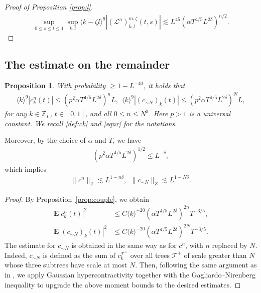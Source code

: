 \documentclass[UTF-8,reqno]{amsart}
\numberwithin{equation}{section}
\newtheorem{proposition}[theorem]{Proposition}
\theoremstyle{definition}
\def\geq{\geqslant}
\def\leq{\leqslant}
\def\geq{\geqslant}
\def\leq{\leqslant}
\begin{document}
\begin{proof}[Proof of Proposition \ref{prop:l}]
\begin{align*}
   \sup _{0 \leq s \leq t \leq 1}   \sup _{k, l}  \langle k-\zeta  l\rangle^{9}\left|\left(\mathscr{L}^{n}\right)_{k, l}^{m, \zeta}(t, s)\right|\lesssim L^{45} (\alpha  T^{4/5} L^{2\delta})^{n/2}.
\end{align*} 


\end{proof}
 

\subsection{The estimate on the remainder}

\begin{proposition}\label{prop:ckn}
      With probability $\geq 1-L^{-40}$, it holds that 
      \begin{align*}
        \langle k\rangle^{9}| c_k^{n}(t)|\leq  (p^2\alpha  T^{4/5}  L^{2\delta} )^{n}L,\ \ \langle k\rangle^{9}|(c_{\sim N})_k(t)|\leq (p^2\alpha  T^{4/5}  L^{2\delta} )^{N}L,
      \end{align*}
     for any $k \in\mathbb{Z}_L$, $t \in[0,1]$, and all $0 \leq  n \leq N^3$. Here $p>1$ is a universal constant. We recall \eqref{def:ck} and \eqref{eqnr} for the notations. 
  \end{proposition}
      
      Moreover, by the choice of $\alpha$ and $T$, we have
      \begin{align*}
          (p^2\alpha  T^{4/5}  L^{2\delta} )^{1/2}\leq L^{-\delta},
      \end{align*}
      which implies 
      \begin{align*}
          \|c^n\|_{Z}\lesssim L^{1-n\delta},\ \ \|c_{\sim N}\|_{Z}\lesssim L^{1-N\delta}.
      \end{align*}


\begin{proof}
   By Proposition~\ref{prop:couple}, we obtain
\begin{align*}
 \mathbf{E}| c_k^{n}(t)|^2
&\leq C \langle k \rangle^{-20} (\alpha T^{4/5} L^{2\delta})^{2n} T^{-3/5},\\
 \mathbf{E}|(c_{\sim N})_k(t)|^2
&\leq C \langle k \rangle^{-20} (\alpha T^{4/5} L^{2\delta})^{2N} T^{-3/5}.
\end{align*}
The estimate for $c_{\sim N}$ is obtained in the same way as for $c^n$, with $n$ replaced by $N$. Indeed, $c_{\sim N}$ is defined as the sum of $c_k^{\mathcal{T}^+}$ over all trees $\mathcal{T}^+$ of scale greater than $N$ whose three subtrees have scale at most $N$.
 Then, following the same argument as in \cite[Proposition 12.1]{DH23a}, we apply Gaussian hypercontractivity together with the Gagliardo–Nirenberg inequality to upgrade the above moment bounds to the desired   estimates. 
\end{proof}
\end{document}
